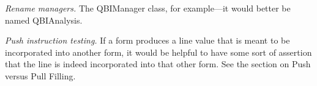 %

\emph{Rename managers.} The QBIManager class, for example---it would better be
named QBIAnalysis.

%
%

\emph{Push instruction testing.} If a form produces a line value that is meant
to be incorporated into another form, it would be helpful to have some sort of
assertion that the line is indeed incorporated into that other form. See the
section on Push versus Pull Filling.
